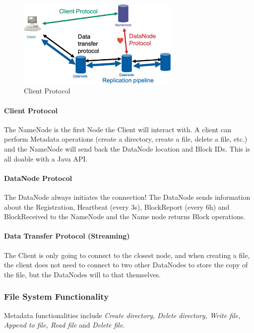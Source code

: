 \begin{figure}[h]
    \centering
    \includegraphics[width=0.7\textwidth]{Figures/ClientProtocol.png}
    \caption{Client Protocol}\label{fig:ClientProtocol}
\end{figure}

\paragraph{Client Protocol}
The NameNode is the first Node the Client will interact with.
A client can perform Metadata operations (create a directory, create a file, delete a file, etc.) and the NameNode will send back the DataNode location and Block IDs. This is all doable with a Java API.

\paragraph{DataNode Protocol}
The DataNode always initiates the connection! The DataNode sends information about the Registration, Heartbeat (every 3s), BlockReport (every 6h) and BlockReceived to the NameNode and the Name node returns Block operations.

\paragraph{Data Transfer Protocol (Streaming)}
The Client is only going to connect to the closest node, and when creating a file, the client does not need to connect to two other DataNodes to store the copy of the file, but the DataNodes will to that themselves.


\subsubsection{File System Functionality}

Metadata functionalities include \textit{Create directory, Delete directory, Write file, Append to file, Read file} and \textit{Delete file}.

